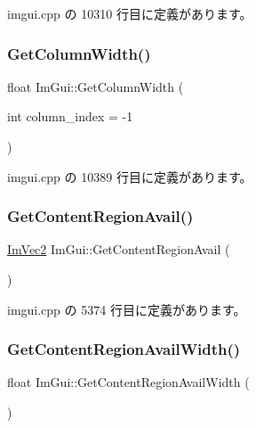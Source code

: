  imgui.\+cpp の 10310 行目に定義があります。

\mbox{\label{namespace_im_gui_a3d205d86dab5ca0763a92997283ac36e}} 
\subsubsection{\texorpdfstring{Get\+Column\+Width()}{GetColumnWidth()}}
{\footnotesize\ttfamily float Im\+Gui\+::\+Get\+Column\+Width (\begin{DoxyParamCaption}\item[{int}]{column\+\_\+index = {\ttfamily -\/1} }\end{DoxyParamCaption})}



 imgui.\+cpp の 10389 行目に定義があります。

\mbox{\label{namespace_im_gui_a410c8e19b2fea8b52746ca11b3930301}} 
\subsubsection{\texorpdfstring{Get\+Content\+Region\+Avail()}{GetContentRegionAvail()}}
{\footnotesize\ttfamily \mbox{\hyperlink{struct_im_vec2}{Im\+Vec2}} Im\+Gui\+::\+Get\+Content\+Region\+Avail (\begin{DoxyParamCaption}{ }\end{DoxyParamCaption})}



 imgui.\+cpp の 5374 行目に定義があります。

\mbox{\label{namespace_im_gui_a52e3311f46626a5d0369139d20da993a}} 
\subsubsection{\texorpdfstring{Get\+Content\+Region\+Avail\+Width()}{GetContentRegionAvailWidth()}}
{\footnotesize\ttfamily float Im\+Gui\+::\+Get\+Content\+Region\+Avail\+Width (\begin{DoxyParamCaption}{ }\end{DoxyParamCaption})}



